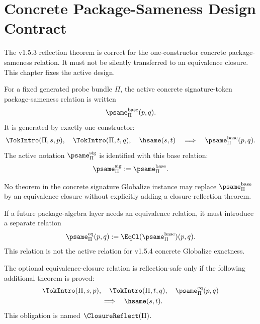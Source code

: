 
\chapter{Concrete Package-Sameness Design Contract}
\label{ch:v154-psame-design-contract}

The v1.5.3 reflection theorem is correct for the one-constructor concrete package-sameness relation. It must not be silently transferred to an equivalence closure. This chapter fixes the active design.

\begin{definition}
\label{def:v154-base-psame}
For a fixed generated probe bundle \(\Pi\), the active concrete signature-token package-sameness relation is written
\[
  \psame_{\Pi}^{\mathrm{base}}(p,q).
\]
It is generated by exactly one constructor:
\[
  \TokIntro(\Pi,s,p),\quad
  \TokIntro(\Pi,t,q),\quad
  \hsame(s,t)
  \quad\Longrightarrow\quad
  \psame_{\Pi}^{\mathrm{base}}(p,q).
\]
The active notation \(\psame_{\Pi}^{\mathrm{sig}}\) is identified with this base relation:
\[
  \psame_{\Pi}^{\mathrm{sig}} := \psame_{\Pi}^{\mathrm{base}}.
\]
\end{definition}

\begin{principle}
\label{prin:v154-no-implicit-closure}
No theorem in the concrete signature Globalize instance may replace \(\psame_{\Pi}^{\mathrm{base}}\) by an equivalence closure without explicitly adding a closure-reflection theorem.
\end{principle}

\begin{definition}
\label{def:v154-psame-eq}
If a future package-algebra layer needs an equivalence relation, it must introduce a separate relation
\[
  \psame_{\Pi}^{\mathrm{eq}}(p,q)
  := \EqCl(\psame_{\Pi}^{\mathrm{base}})(p,q).
\]
This relation is not the active relation for v1.5.4 concrete Globalize exactness.
\end{definition}

\begin{definition}
\label{def:v154-closure-reflection}
The optional equivalence-closure relation is reflection-safe only if the following additional theorem is proved:
\[
\begin{aligned}
  &\TokIntro(\Pi,s,p),\quad
    \TokIntro(\Pi,t,q),\quad
    \psame_{\Pi}^{\mathrm{eq}}(p,q)\\
  &\hspace{3.0cm}\Longrightarrow\quad \hsame(s,t).
\end{aligned}
\]
This obligation is named \(\ClosureReflect(\Pi)\).
\end{definition}

